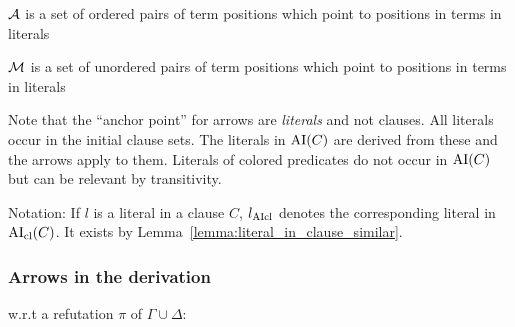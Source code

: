 \documentclass[,%
	paper=a4,%
	DIV12, %
	twoside=false,%
	liststotoc,
	bibtotoc,
	draft=false,%
	numbers=noendperiod
]{scrartcl}
\begin{document}
$\operatorname{\mathcal{A}}$ is a set of ordered pairs of term positions which point to positions in terms in literals

$\operatorname{\operatorname{\mathcal{M}}}$ is a set of unordered pairs of term positions which point to positions in terms in literals

Note that the ``anchor point'' for arrows are \emph{literals} and not clauses.
All literals occur in the initial clause sets.
The literals in $\operatorname{AI}(C)$ are derived from these and the arrows apply to them.
Literals of colored predicates do not occur in $\operatorname{AI}(C)$ but can be relevant by transitivity.

Notation: If $l$ is a literal in a clause $C$, $l_{\operatorname{AIcl}}$ denotes the corresponding literal in $\operatorname{AI}_\mathrm{cl}(C)$. It exists by Lemma~\ref{lemma:literal_in_clause_similar}.

\subsubsection{Arrows in the derivation}
w.r.t a refutation $\pi$ of $\Gamma \cup \Delta$:
\end{document}
